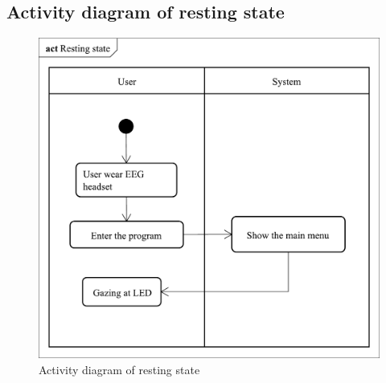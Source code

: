 \subsection{Activity diagram of resting state}
\begin{figure}[ht]
	\centering
	\includegraphics[scale = 0.295]{chapter4/Rest.pdf}
	\caption{Activity diagram of resting state}
\end{figure}


